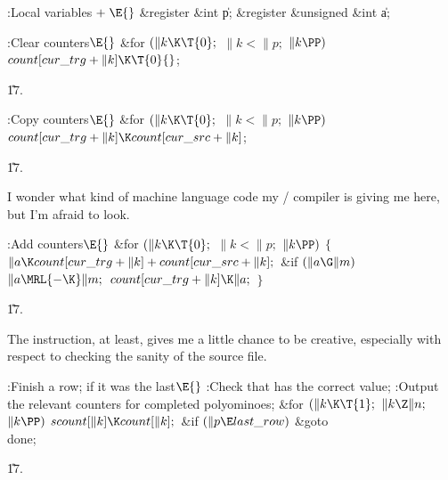 \B{}:Local variables\X${}\mathrel+\E{}$\6
\&{register} \&{int} \|p;\6
\&{register} \&{unsigned} \&{int} \|a;\par
\fi

\B{}:Clear  counters\X${}\E{}$\6
\&{for} ${}(\|k\K\T{0};{}$ ${}\|k<\|p;{}$ ${}\|k\PP){}$\1\5
${}\\{count}[\\{cur\_trg}+\|k]\K\T{0}{}$;\2\par
\U17.\fi

\B{}:Copy  counters\X${}\E{}$\6
\&{for} ${}(\|k\K\T{0};{}$ ${}\|k<\|p;{}$ ${}\|k\PP){}$\1\5
${}\\{count}[\\{cur\_trg}+\|k]\K\\{count}[\\{cur\_src}+\|k]{}$;\2\par
\U17.\fi

I wonder what kind of machine language code my \CEE/
compiler
is giving me here, but I'm afraid to look.

\Y\B\4:Add  counters\X${}\E{}$\6
\&{for} ${}(\|k\K\T{0};{}$ ${}\|k<\|p;{}$ ${}\|k\PP){}$\5
${}\{{}$\1\6
${}\|a\K\\{count}[\\{cur\_trg}+\|k]+\\{count}[\\{cur\_src}+\|k];{}$\6
\&{if} ${}(\|a\G\|m){}$\1\5
${}\|a\MRL{-{\K}}\|m;{}$\2\6
${}\\{count}[\\{cur\_trg}+\|k]\K\|a;{}$\6
\4${}\}{}$\2\par
\U17.\fi

The  instruction, at least, gives me a
little chance to be creative,
especially with respect to checking the sanity of the source file.

\Y\B\4:Finish a row;  if it was the last\X${}\E{}$\6
:Check that  has the correct value\X;\6
:Output the relevant counters for completed polyominoes\X;\6
\&{for} ${}(\|k\K\T{1};{}$ ${}\|k\Z\|n;{}$ ${}\|k\PP){}$\1\5
${}\\{scount}[\|k]\K\\{count}[\|k];{}$\2\6
\&{if} ${}(\|p\E\\{last\_row}){}$\1\5
\&{goto} \\{done};\2\par
\U17.\fi

